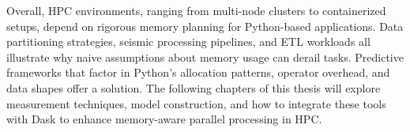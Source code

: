 Overall, \ac{HPC} environments, ranging from multi-node clusters to containerized setups, depend on rigorous memory planning for Python-based applications.
Data partitioning strategies, seismic processing pipelines, and \ac{ETL} workloads all illustrate why naive assumptions about memory usage can derail tasks.
Predictive frameworks that factor in Python's allocation patterns, operator overhead, and data shapes offer a solution.
The following chapters of this thesis will explore measurement techniques, model construction, and how to integrate these tools with Dask to enhance memory-aware parallel processing in \ac{HPC}.
